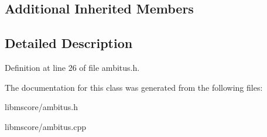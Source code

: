 \subsection*{Additional Inherited Members}


\subsection{Detailed Description}


Definition at line 26 of file ambitus.\+h.



The documentation for this class was generated from the following files\+:\begin{DoxyCompactItemize}
\item 
libmscore/ambitus.\+h\item 
libmscore/ambitus.\+cpp\end{DoxyCompactItemize}
